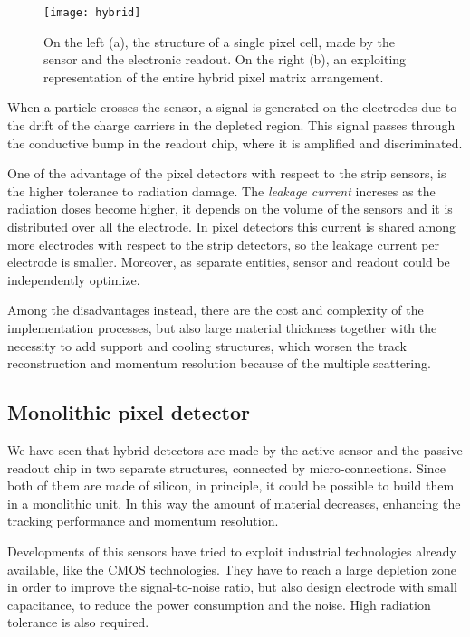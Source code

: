 \begin{figure}[h!]
\centering
\texttt{[image: hybrid]}
\caption{On the left (a), the structure of a single pixel cell, made by the sensor and the electronic readout. On the right (b), an exploiting representation of the entire hybrid pixel matrix arrangement.}
\label{fig:hybrid}
\end{figure}

When a particle crosses the sensor, a signal is generated on the electrodes due to the drift of the charge carriers in the depleted region. This signal passes through the conductive bump in the readout chip, where it is amplified and discriminated.

One of the advantage of the pixel detectors with respect to the strip sensors, is the higher tolerance to radiation damage. The \emph{leakage current} increses as the radiation doses become higher, it depends on the volume of the sensors and it is distributed over all the electrode. In pixel detectors this current is shared among more electrodes with respect to the strip detectors, so the leakage current per electrode is smaller. Moreover, as separate entities, sensor and readout could be independently optimize.

Among the disadvantages instead, there are the cost and complexity of the implementation processes, but also large material thickness together with the necessity to add support and cooling structures, which worsen the track reconstruction and momentum resolution because of the multiple scattering.


\subsection{Monolithic pixel detector}

We have seen that hybrid detectors are made by the active sensor and the passive readout chip in two separate structures, connected by micro-connections. Since both of them are made of silicon, in principle, it could be possible to build them in a monolithic unit. In this way the amount of material decreases, enhancing the tracking performance and momentum resolution. 

Developments of this sensors have tried to exploit industrial technologies already available, like the CMOS technologies. They have to reach a large depletion zone in order to improve the signal-to-noise ratio, but also design electrode with small capacitance, to reduce the power consumption and the noise. High radiation tolerance is also required.

